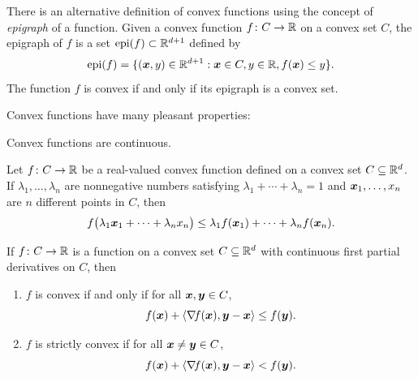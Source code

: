 \begin{remark}
There is an alternative definition of convex functions using the concept of \emph{epigraph} of a function.  Given a convex function $f\colon C \to \mathbb{R}$ on a convex set $C$, the epigraph of $f$ is a set $\operatorname{epi}(f) \subset \mathbb{R}^{d+1}$ defined by
\begin{equation*}
\operatorname{epi}(f) = \{ (\boldsymbol{x},y) \in \mathbb{R}^{d+1} : \boldsymbol{x} \in C, y \in \mathbb{R}, f(\boldsymbol{x}) \leq y \}.
\end{equation*}
The function $f$ is convex if and only if its epigraph is a convex set.
\end{remark}

Convex functions have many pleasant properties:
\begin{theorem}\label{theorem:ConvexIsContinuous}
Convex functions are continuous.
\end{theorem}

\begin{theorem}
Let $f\colon C \to \mathbb{R}$ be a real-valued convex function defined on a convex set $C \subseteq \mathbb{R}^d$.  If $\lambda_1, \dotsc, \lambda_n$ are nonnegative numbers satisfying $\lambda_1 + \dotsb + \lambda_n = 1$ and $\boldsymbol{x}_1, \dotsc, x_n$ are $n$ different points in $C$, then
\begin{equation*}
f\big( \lambda_1 \boldsymbol{x}_1 + \dotsb + \lambda_n x_n \big) \leq \lambda_1 f(\boldsymbol{x}_1) + \dotsb + \lambda_n f(\boldsymbol{x}_n).
\end{equation*}
\end{theorem}

\begin{theorem}\label{theorem:convexAboveTangentHyperplane}
If $f\colon C \to \mathbb{R}$ is a function on a convex set $C \subseteq \mathbb{R}^d$ with continuous first partial derivatives on $C$, then
\begin{enumerate}
	\item $f$ is convex if and only if for all $\boldsymbol{x}, \boldsymbol{y} \in C$,
	\begin{equation*}
	f(\boldsymbol{x}) + \langle \mathop{\nabla\! {f}}(\boldsymbol{x}), \boldsymbol{y} - \boldsymbol{x} \rangle \leq f(\boldsymbol{y}).
	\end{equation*}
	\item $f$ is strictly convex if for all $\boldsymbol{x} \neq \boldsymbol{y} \in C$,
	\begin{equation*}
	f(\boldsymbol{x}) + \langle \mathop{\nabla\! {f}}(\boldsymbol{x}), \boldsymbol{y} - \boldsymbol{x} \rangle < f(\boldsymbol{y}).
	\end{equation*}
\end{enumerate}
\end{theorem}

